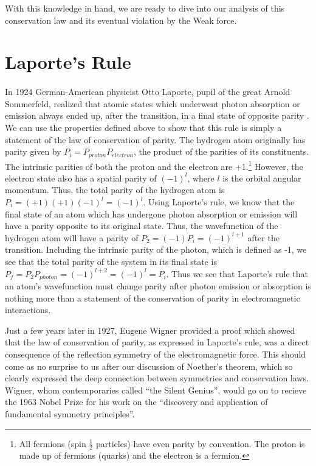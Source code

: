 \documentclass[a4paper,12pt]{book}
\begin{document}
With this knowledge in hand, we are ready to dive into our analysis of this conservation law and its eventual violation by the Weak force.

\section{Laporte's Rule}

\paragraph*{}In 1924 German-American physicist Otto Laporte, pupil of the great Arnold Sommerfeld, realized that atomic states which underwent photon absorption or emission always ended up, after the transition, in a final state of opposite parity \cite{laporte}. We can use the properties defined above to show that this rule is simply a statement of the law of conservation of parity. The hydrogen atom originally has parity given by $P_{i}=P_{proton}P_{electron}$, the product of the parities of its constituents. The intrinsic parities of both the proton and the electron are +1.\footnote{All fermions (spin $\frac{1}{2}$ particles) have even parity by convention. The proton is made up of fermions (quarks) and the electron is a fermion.} However, the electron state also has a spatial parity of $(-1)^{l}$, where $l$ is the orbital angular momentum. Thus, the total parity of the hydrogen atom is $P_{i}=(+1)(+1)(-1)^{l}=(-1)^{l}$. Using Laporte's rule, we know that the final state of an atom which has undergone photon absorption or emission will have a parity opposite to its original state. Thus, the wavefunction of the hydrogen atom will have a parity of $P_{2}=(-1)P_{i}=(-1)^{l+1}$ after the transition. Including the intrinsic parity of the photon, which is defined as -1, we see that the total parity of the system in its final state is $P_{f}=P_{2}P_{photon}=(-1)^{l+2}=(-1)^{l}=P_{i}$. Thus we see that Laporte's rule that an atom's wavefunction must change parity after photon emission or absorption is nothing more than a statement of the conservation of parity in electromagnetic interactions.

Just a few years later in 1927, Eugene Wigner provided a proof which showed that the law of conservation of parity, as expressed in Laporte's rule, was a direct consequence of the reflection symmetry of the electromagnetic force\cite{yang}. This should come as no surprise to us after our discussion of Noether's theorem, which so clearly expressed the deep connection between symmetries and conservation laws. Wigner, whom contemporaries called ``the Silent Genius'', would go on to recieve the 1963 Nobel Prize for his work on the ``discovery and application of fundamental symmetry principles''.
\end{document}
